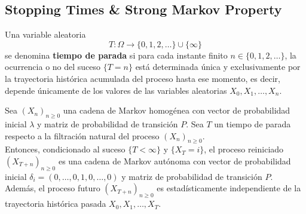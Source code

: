 \documentclass[10pt]{book}
\begin{document}
\subsection{Stopping Times \& Strong Markov Property}

\begin{definicion}
    Una variable aleatoria 
    $$T: \Omega \rightarrow \{0, 1, 2, \dots\} \cup \{\infty\}$$ 
    se denomina \textbf{tiempo de parada} si para cada instante finito $n \in \{0, 1, 2, \dots\}$, la ocurrencia o no del suceso $\{T = n\}$ está determinada única y exclusivamente por la trayectoria histórica acumulada del proceso hasta ese momento, es decir, depende únicamente de los valores de las variables aleatorias $X_0, X_1, \dots, X_n$.
\end{definicion}


\begin{teo}
    Sea $(X_n)_{n \geq 0}$ una cadena de Markov homogénea con vector de probabilidad inicial $\lambda$ y matriz de probabilidad de transición $P$. Sea $T$ un tiempo de parada respecto a la filtración natural del proceso $(X_n)_{n \geq 0}$. \\

    \noindent
    Entonces, condicionado al suceso $\{T < \infty\}$ y $\{X_T = i\}$, el proceso reiniciado $(X_{T+n})_{n \geq 0}$ es una cadena de Markov autónoma con vector de probabilidad inicial $\delta_i = (0, \dots, 0, 1, 0, \dots, 0)$ y matriz de probabilidad de transición $P$. Además, el proceso futuro $(X_{T+n})_{n \geq 0}$ es estadísticamente independiente de la trayectoria histórica pasada $X_0, X_1, \dots, X_T$. \\
\end{teo}
\end{document}
